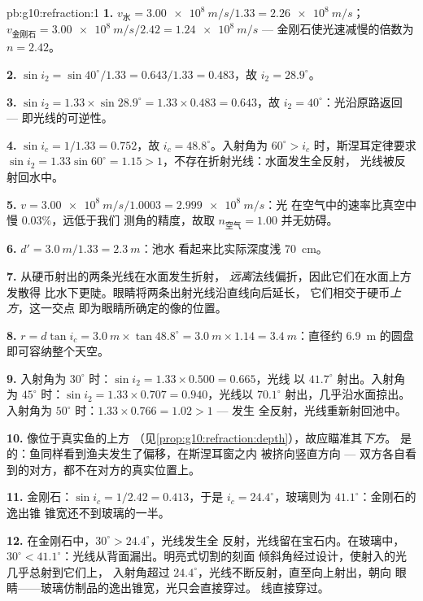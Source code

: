 \begin{solution}{pb:g10:refraction:1}
\textbf{1.} $v_{\text{水}} = \qty{3.00e8}{m/s}/1.33 =
\qty{2.26e8}{m/s}$；$v_{\text{金刚石}} = \qty{3.00e8}{m/s}/2.42 =
\qty{1.24e8}{m/s}$ --- 金刚石使光速减慢的倍数为 $n = 2.42$。

\textbf{2.} $\sin i_2 = \sin 40^\circ / 1.33 = 0.643/1.33 = 0.483$，故
$i_2 = 28.9^\circ$。

\textbf{3.} $\sin i_2 = 1.33 \times \sin 28.9^\circ = 1.33 \times
0.483 = 0.643$，故 $i_2 = 40^\circ$：光沿原路返回 ---
即光线的可逆性。

\textbf{4.} $\sin i_c = 1/1.33 = 0.752$，故 $i_c = 48.8^\circ$。入射角为
$60^\circ > i_c$ 时，斯涅耳定律要求 $\sin i_2 = 1.33 \sin
60^\circ = 1.15 > 1$，不存在折射光线：水面发生全反射，
光线被反射回水中。

\textbf{5.} $v = \qty{3.00e8}{m/s}/1.0003 = \qty{2.999e8}{m/s}$：光
在空气中的速率比真空中慢 $0.03\%$，远低于我们
测角的精度，故取 $n_{\text{空气}} = 1.00$ 并无妨碍。

\textbf{6.} $d' = \qty{3.0}{m}/1.33 = \qty{2.3}{m}$：池水
看起来比实际深度浅 \qty{70}{cm}。

\textbf{7.} 从硬币射出的两条光线在水面发生折射，
\emph{远离}法线偏折，因此它们在水面上方发散得
比水下更陡。眼睛将两条出射光线沿直线向后延长，
它们相交于硬币\emph{上方}，这一交点
即为眼睛所确定的像的位置。

\textbf{8.} $r = d \tan i_c = \qty{3.0}{m} \times \tan 48.8^\circ =
\qty{3.0}{m} \times 1.14 = \qty{3.4}{m}$：直径约 \qty{6.9}{m}
的圆盘即可容纳整个天空。

\textbf{9.} 入射角为 $30^\circ$ 时：$\sin i_2 = 1.33 \times 0.500 = 0.665$，光线
以 $41.7^\circ$ 射出。入射角为 $45^\circ$ 时：$\sin i_2 = 1.33 \times
0.707 = 0.940$，光线以 $70.1^\circ$ 射出，几乎沿水面掠出。入射角为
$50^\circ$ 时：$1.33 \times 0.766 = 1.02 > 1$ --- 发生
全反射，光线重新射回池中。

\textbf{10.} 像位于真实鱼的上方
（见\cref{prop:g10:refraction:depth}），故应瞄准其\emph{下方}。
是的：鱼同样看到渔夫发生了偏移，在斯涅耳窗之内
被挤向竖直方向 --- 双方各自看到的对方，都不在对方的真实位置上。

\textbf{11.} 金刚石：$\sin i_c = 1/2.42 = 0.413$，于是
$i_c = 24.4^\circ$，玻璃则为 $41.1^\circ$：金刚石的逸出锥
锥宽还不到玻璃的一半。

\textbf{12.} 在金刚石中，$30^\circ > 24.4^\circ$，光线发生全
反射，光线留在宝石内。在玻璃中，
$30^\circ < 41.1^\circ$：光线从背面漏出。明亮式切割的刻面
倾斜角经过设计，使射入的光几乎总射到它们上，
入射角超过 $24.4^\circ$，光线不断反射，直至向上射出，朝向
眼睛——玻璃仿制品的逸出锥宽，光只会直接穿过。
线直接穿过。


\end{solution}
